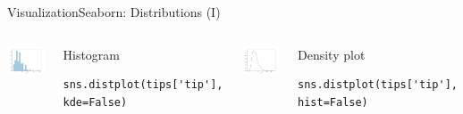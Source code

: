 \documentclass[10pt,compress]{beamer} %
\begin{document}
\begin{frame}[fragile]{Visualization}{Seaborn: Distributions (I)}
	\begin{columns}[t]
	\includegraphics[width=\textwidth]{figs/sns-histogram.png}\\

	\begin{exampleblock}{\footnotesize{Histogram}}
	\vspace{-0.2cm} 
	\begin{lstlisting}[basicstyle=\small]
	sns.distplot(tips['tip'], kde=False)
	\end{lstlisting}
	\vspace{-0.2cm} 
	\end{exampleblock}

	\includegraphics[width=\textwidth]{figs/sns-histogram2.png}\\
	\begin{exampleblock}{\footnotesize{Density plot}}
	\vspace{-0.2cm} 
	\begin{lstlisting}[basicstyle=\small]
	sns.distplot(tips['tip'], hist=False)
	\end{lstlisting}
	\vspace{-0.2cm} 
	\end{exampleblock}
	\end{columns}
\end{frame}
\end{document}
